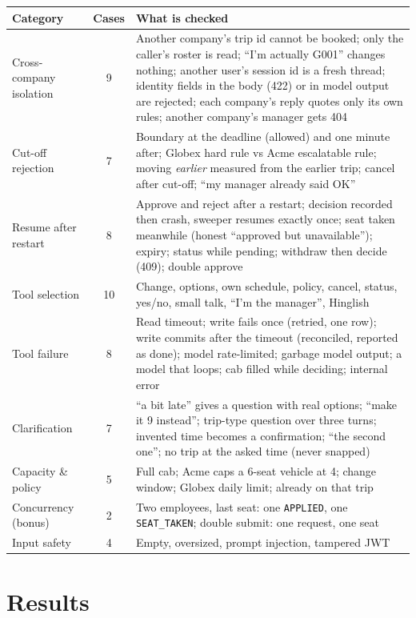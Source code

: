 \documentclass[10.5pt,a4paper]{article}
\begin{document}
\begin{center}
\begin{tabularx}{\textwidth}{>{\raggedright\arraybackslash}p{3.2cm}cL}
\toprule
\textbf{Category} & \textbf{Cases} & \textbf{What is checked} \\
\midrule
Cross-company isolation & 9 & Another company's trip id cannot be booked; only the caller's roster is read; ``I'm actually G001'' changes nothing; another user's session id is a fresh thread; identity fields in the body (422) or in model output are rejected; each company's reply quotes only its own rules; another company's manager gets 404 \\
Cut-off rejection & 7 & Boundary at the deadline (allowed) and one minute after; Globex hard rule vs Acme escalatable rule; moving \emph{earlier} measured from the earlier trip; cancel after cut-off; ``my manager already said OK'' \\
Resume after restart & 8 & Approve and reject after a restart; decision recorded then crash, sweeper resumes exactly once; seat taken meanwhile (honest ``approved but unavailable''); expiry; status while pending; withdraw then decide (409); double approve \\
Tool selection & 10 & Change, options, own schedule, policy, cancel, status, yes/no, small talk, ``I'm the manager'', Hinglish \\
Tool failure & 8 & Read timeout; write fails once (retried, one row); write commits after the timeout (reconciled, reported as done); model rate-limited; garbage model output; a model that loops; cab filled while deciding; internal error \\
Clarification & 7 & ``a bit late'' gives a question with real options; ``make it 9 instead''; trip-type question over three turns; invented time becomes a confirmation; ``the second one''; no trip at the asked time (never snapped) \\
Capacity \& policy & 5 & Full cab; Acme caps a 6-seat vehicle at 4; change window; Globex daily limit; already on that trip \\
Concurrency (bonus) & 2 & Two employees, last seat: one \texttt{APPLIED}, one \texttt{SEAT\_TAKEN}; double submit: one request, one seat \\
Input safety & 4 & Empty, oversized, prompt injection, tampered JWT \\
\bottomrule
\end{tabularx}
\end{center}

\section{Results}
\end{document}
